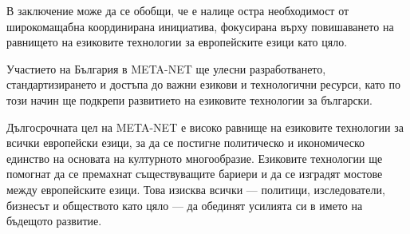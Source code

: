 \begin{multicols}{2}
В заключение може да се обобщи, че  е налице остра необходимост от широкомащабна координирана инициатива, фокусирана върху повишаването на  равнището на езиковите технологии за европейските езици като цяло.

Участието на България в
META-NET ще улесни
разработването, стандартизирането и достъпа до
важни езикови и технологични ресурси, като по този
начин ще подкрепи развитието на езиковите
технологии за български.

Дългосрочната цел на META-NET е високо равнище на езиковите технологии за всички европейски езици, за да се постигне политическо и икономическо единство на основата на културното многообразие. Езиковите технологии ще помогнат да се премахнат съществуващите бариери и да се изградят мостове между европейските езици. Това изисква всички — политици, изследователи, бизнесът и обществото като цяло — да обединят усилията си в името на бъдещото развитие. 



\end{multicols}

\cleardoublepage




